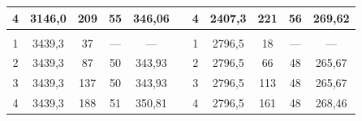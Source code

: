 \documentclass[11pt,a4paper,oneside]{article}
\begin{document}
\begin{enumerate}
\begin{center}
\begin{table}[h!]
\begin{tabular}{ccccccccccc}
\multicolumn{1}{|c|}{4}          & \multicolumn{1}{c|}{3146,0}         & \multicolumn{1}{c|}{209}            & \multicolumn{1}{c|}{55}                      & \multicolumn{1}{c|}{346,06}          & \multicolumn{1}{c|}{}          & \multicolumn{1}{c|}{4}          & \multicolumn{1}{c|}{2407,3}         & \multicolumn{1}{c|}{221}            & \multicolumn{1}{c|}{56}                     & \multicolumn{1}{c|}{269,62}          \\ \hline
\multicolumn{1}{|c|}{}           & \multicolumn{1}{c|}{}               & \multicolumn{1}{c|}{}               & \multicolumn{1}{c|}{}                        & \multicolumn{1}{c|}{}                & \multicolumn{1}{c|}{}          & \multicolumn{1}{c|}{}           & \multicolumn{1}{c|}{}               & \multicolumn{1}{c|}{}               & \multicolumn{1}{c|}{}                       & \multicolumn{1}{c|}{}                \\ \hline
\multicolumn{1}{|c|}{1}          & \multicolumn{1}{c|}{3439,3}         & \multicolumn{1}{c|}{37}             & \multicolumn{1}{c|}{---}                     & \multicolumn{1}{c|}{---}             & \multicolumn{1}{c|}{}          & \multicolumn{1}{c|}{1}          & \multicolumn{1}{c|}{2796,5}         & \multicolumn{1}{c|}{18}             & \multicolumn{1}{c|}{---}                    & \multicolumn{1}{c|}{---}             \\ \hline
\multicolumn{1}{|c|}{2}          & \multicolumn{1}{c|}{3439,3}         & \multicolumn{1}{c|}{87}             & \multicolumn{1}{c|}{50}                      & \multicolumn{1}{c|}{343,93}          & \multicolumn{1}{c|}{}          & \multicolumn{1}{c|}{2}          & \multicolumn{1}{c|}{2796,5}         & \multicolumn{1}{c|}{66}             & \multicolumn{1}{c|}{48}                     & \multicolumn{1}{c|}{265,67}          \\ \hline
\multicolumn{1}{|c|}{3}          & \multicolumn{1}{c|}{3439,3}         & \multicolumn{1}{c|}{137}            & \multicolumn{1}{c|}{50}                      & \multicolumn{1}{c|}{343,93}          & \multicolumn{1}{c|}{}          & \multicolumn{1}{c|}{3}          & \multicolumn{1}{c|}{2796,5}         & \multicolumn{1}{c|}{113}            & \multicolumn{1}{c|}{48}                     & \multicolumn{1}{c|}{265,67}          \\ \hline
\multicolumn{1}{|c|}{4}          & \multicolumn{1}{c|}{3439,3}         & \multicolumn{1}{c|}{188}            & \multicolumn{1}{c|}{51}                      & \multicolumn{1}{c|}{350,81}          & \multicolumn{1}{c|}{}          & \multicolumn{1}{c|}{4}          & \multicolumn{1}{c|}{2796,5}         & \multicolumn{1}{c|}{161}            & \multicolumn{1}{c|}{48}                     & \multicolumn{1}{c|}{268,46}          \\ \hline

\end{tabular}
\end{table}
\end{center}
\end{enumerate}
\end{document}
